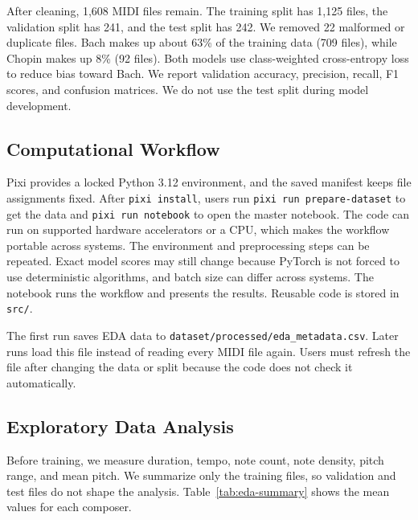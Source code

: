 \documentclass[stu, floatsintext]{apa7}
\begin{document}
After cleaning, 1,608 MIDI files remain. The training split has 1,125 files, the
validation split has 241, and the test split has 242. We removed 22 malformed or
duplicate files. Bach makes up about 63\% of the training data (709 files), while
Chopin makes up 8\% (92 files). Both models use class-weighted cross-entropy loss
to reduce bias toward Bach. We report validation accuracy, precision, recall, F1
scores, and confusion matrices. We do not use the test split during model
development.

\subsection{Computational Workflow}
Pixi provides a locked Python 3.12 environment, and the saved manifest keeps file
assignments fixed. After \texttt{pixi install}, users run \texttt{pixi run
prepare-dataset} to get the data and \texttt{pixi run notebook} to open the
master notebook. The code can run on supported hardware accelerators or a CPU,
which makes the workflow portable across systems. The environment and
preprocessing steps can be repeated. Exact model scores may still change because
PyTorch is not forced to use deterministic algorithms, and batch size can differ
across systems. The notebook runs the workflow and presents the results. Reusable
code is stored in \texttt{src/}.

The first run saves EDA data to
\texttt{dataset/processed/eda\_metadata.csv}. Later runs load this file instead
of reading every MIDI file again. Users must refresh the file after changing the
data or split because the code does not check it automatically.

\subsection{Exploratory Data Analysis}
Before training, we measure duration, tempo, note count, note density, pitch
range, and mean pitch. We summarize only the training files, so validation and
test files do not shape the analysis. Table~\ref{tab:eda-summary} shows the mean
values for each composer.
\end{document}

